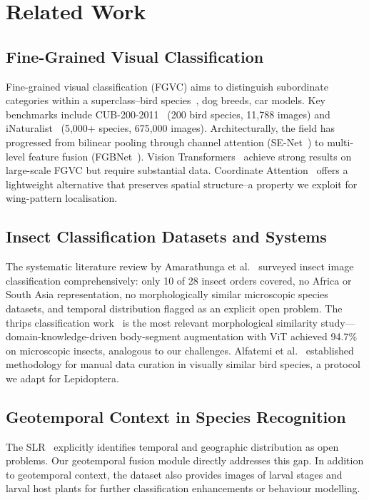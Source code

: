 \documentclass[runningheads]{llncs}
\begin{document}
\section{Related Work}
\subsection{Fine-Grained Visual Classification}
Fine-grained visual classification (FGVC) aims to distinguish subordinate categories within a superclass--bird species~\cite{wah2011cub}, dog breeds, car models. Key benchmarks include CUB-200-2011~\cite{wah2011cub} (200 bird species, 11,788 images) and iNaturalist~\cite{vanhorn2018inaturalist} (5,000+ species, 675,000 images). Architecturally, the field has progressed from bilinear pooling through channel attention (SE-Net~\cite{hu2018squeeze}) to multi-level feature fusion (FGBNet~\cite{yuan2025fgbnet}). Vision Transformers~\cite{dosovitski2021image} achieve strong results on large-scale FGVC but require substantial data. Coordinate Attention~\cite{hou2021coordinate} offers a lightweight alternative that preserves spatial structure--a property we exploit for wing-pattern localisation.
\subsection{Insect Classification Datasets and Systems}
The systematic literature review by Amarathunga et al.~\cite{amarathunga2021slr} surveyed insect image classification comprehensively: only 10 of 28 insect orders covered, no Africa or South Asia representation, no morphologically similar microscopic species datasets, and temporal distribution flagged as an explicit open problem. The thrips classification work~\cite{amarathunga2022thrips} is the most relevant morphological similarity study---domain-knowledge-driven body-segment augmentation with ViT achieved 94.7\% on microscopic insects, analogous to our challenges. Alfatemi et al.~\cite{alfatemi2024birds} established methodology for manual data curation in visually similar bird species, a protocol we adapt for Lepidoptera.

\subsection{Geotemporal Context in Species Recognition}
The SLR~\cite{amarathunga2021slr} explicitly identifies temporal and geographic distribution as open problems. Our geotemporal fusion module directly addresses this gap. In addition to geotemporal context, the dataset also provides images of larval stages and larval host plants for further classification enhancements or behaviour modelling.
\end{document}
